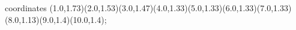 					coordinates { (1.0,1.73)(2.0,1.53)(3.0,1.47)(4.0,1.33)(5.0,1.33)(6.0,1.33)(7.0,1.33)(8.0,1.13)(9.0,1.4)(10.0,1.4)};